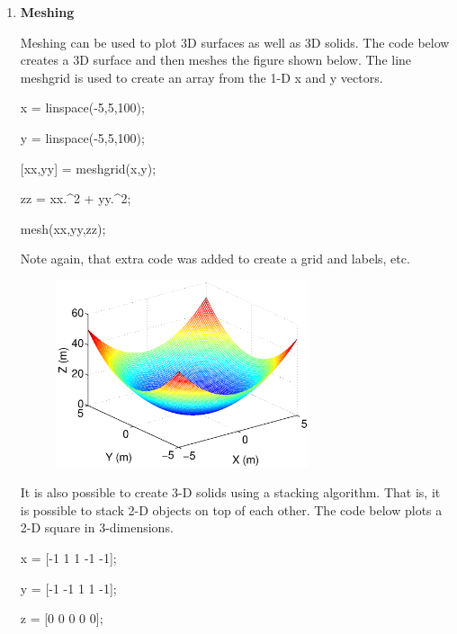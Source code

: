 \begin{enumerate}
\item {\bf Meshing}

Meshing can be used to plot 3D surfaces as well as 3D solids. The code
below creates a 3D surface and then meshes the figure shown below. The
line meshgrid is used to create an array from the 1-D x and y vectors.

\begin{framed}

x = linspace(-5,5,100);

y = linspace(-5,5,100);

[xx,yy] = meshgrid(x,y);

zz = xx.\textrm{\^}2 + yy.\textrm{\^}2;

mesh(xx,yy,zz);

\end{framed}

Note again, that extra code was added to create a grid and labels,
etc. 

\clearpage

\begin{figure}[htb]
  \begin{center}
    \includegraphics[height=0.55\textwidth,width=0.7\textwidth]{Graphics/Meshing}
  \end{center}
\end{figure}

It is also possible to create 3-D solids using a stacking
algorithm. That is, it is possible to stack 2-D objects on top of each
other. The code below plots a 2-D square in 3-dimensions. 

\begin{framed}

x = [-1 1 1 -1 -1];

y = [-1 -1 1 1 -1];

z = [0 0 0 0 0];


\end{framed}
\end{enumerate}
